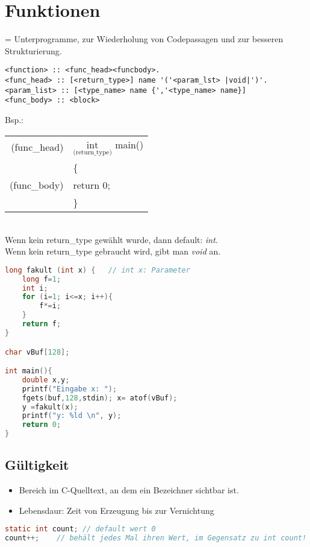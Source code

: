 \section{Funktionen}

= Unterprogramme, zur Wiederholung von Codepassagen und zur besseren Strukturierung.
\begin{lstlisting}
<function> :: <func_head><funcbody>.
<func_head> :: [<return_type>] name '('<param_lst> |void|')'.
<param_list> :: [<type_name> name {','<type_name> name}]
<func_body> :: <block>
\end{lstlisting}
Bsp.:\\
\begin{tabular}{r l}
(func\_head) & $\underset{\text{(return\_type)}}{\text{int}}$ main()\\
 & \{ \\
(func\_body) & return 0;\\
& \} \\
\end{tabular}\\
Wenn kein return\_type gewählt wurde, dann default: \emph{int}.\\
Wenn kein return\_type gebraucht wird, gibt man \emph{void} an.
\begin{lstlisting}[language=C]
long fakult (int x) {	// int x: Parameter
	long f=1;
	int i;
	for (i=1; i<=x; i++){
		f*=i;
	}
	return f;
}

char vBuf[128];

int main(){
	double x,y;
	printf("Eingabe x: ");
	fgets(buf,128,stdin); x= atof(vBuf);
	y =fakult(x);
	printf("y: %ld \n", y);
	return 0;
}
\end{lstlisting}

\subsection{Gültigkeit}
\begin{itemize}
\item Bereich im C-Quelltext, an dem ein Bezeichner sichtbar ist.
\item Lebensdaur: Zeit von Erzeugung bis zur Vernichtung
\end{itemize}
\begin{lstlisting}[language = C]
static int count; // default wert 0
count++;	// behält jedes Mal ihren Wert, im Gegensatz zu int count!
\end{lstlisting}
